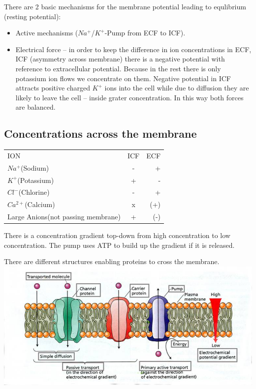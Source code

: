 \documentclass[english,11pt]{article}
\begin{document}
There are 2 basic mechanisms for the membrane potential leading to equlibrium (resting potential):
\begin{itemize}
\item Active mechanisms ($Na^+$/$K^+$-Pump from ECF to ICF).
\item Electrical force -- in order to keep the difference in ion concentrations in ECF, ICF (asymmetry across membrane) there is a negative potential with reference to extracellular potential. Because in the rest there is only potassium ion flows we concentrate on them. Negative potential in ICF attracts positive charged $K^+$ ions into the cell while due to diffusion they are likely to leave the cell -- inside grater concentration.
In this way both forces are balanced.
\end{itemize}

\subsection{Concentrations across the membrane}

\begin{center}
\begin{tabular}{ l | c | r }
 ION	& ICF & ECF \\
  $Na^+$(Sodium) & - & + \\
  $K^+$(Potassium) & + & - \\
  $Cl^-$(Chlorine) & - & + \\
  $Ca^{2+}$(Calcium) & x & (+) \\
  Large Anions(not passing membrane) & + & (-) \\
\end{tabular}
\end{center}

There is a concentration gradient top-down from high concentration to low concentration. The pump uses ATP to build up the gradient if it is released.

There are different structures enabling proteins to cross the membrane. 
\includegraphics[width=\textwidth]{bilayer-closeup2.png}
\end{document}
